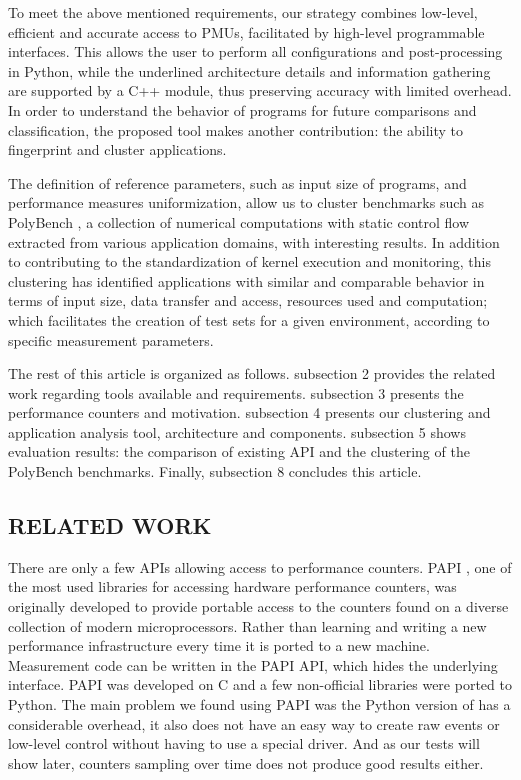 To meet the above mentioned requirements, our strategy combines low-level, efficient and accurate access to PMUs, facilitated by high-level programmable interfaces. This allows the user to perform all configurations and post-processing in Python,  while the underlined architecture details and information gathering are supported by a C++ module, thus preserving accuracy with limited overhead. 
In order to understand the behavior of programs for future comparisons and classification, the proposed tool makes another contribution: the ability to fingerprint and cluster applications.

The definition of reference parameters, such as input size of programs, and performance measures uniformization, allow us to cluster benchmarks such as PolyBench \cite{PolyBench/C3.2}, a collection of numerical computations with static control flow extracted from various application domains, with interesting results. 
In addition to contributing to the standardization of kernel execution and monitoring, this clustering has identified applications with similar and comparable behavior in terms of input size, data transfer and access, resources used and computation; which facilitates the creation of test sets for a given environment, according to specific measurement parameters. 

The rest of this article is organized as follows. subsection 2 provides the related work regarding tools available and requirements. subsection 3 presents the performance counters and motivation. subsection 4 presents our clustering and application analysis tool, architecture and components. subsection 5 shows evaluation results: the comparison of existing API and the clustering of the PolyBench benchmarks. Finally, subsection 8 concludes this article.

\subsection{RELATED WORK}

There are only a few APIs allowing access to performance counters.
PAPI \cite{Weaver2013, Mucci1999}, one of the most used libraries for accessing hardware performance counters, was originally developed to provide portable access to the counters found on a diverse collection of modern microprocessors. Rather than learning and writing a new performance infrastructure every time it is ported to a new machine. Measurement code can be written in the PAPI API, which hides the underlying interface.  
PAPI was developed on C and a few non-official libraries were ported to Python. The main problem we found using PAPI was the Python version of has a considerable overhead, it also does not have an easy way to create raw events or low-level control without having to use a special driver. And as our tests will show later, counters sampling over time does not produce good results either.

